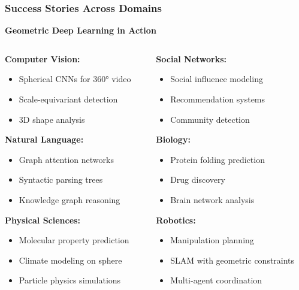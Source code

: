 \begin{frame}[fragile]\frametitle{Success Stories Across Domains}

\begin{center}
\textbf{Geometric Deep Learning in Action}
\end{center}

\begin{columns}
\begin{column}{0.5\textwidth}
\textbf{Computer Vision:}
\begin{itemize}
\item Spherical CNNs for 360° video
\item Scale-equivariant detection
\item 3D shape analysis
\end{itemize}

\textbf{Natural Language:}
\begin{itemize}
\item Graph attention networks
\item Syntactic parsing trees
\item Knowledge graph reasoning
\end{itemize}

\textbf{Physical Sciences:}
\begin{itemize}
\item Molecular property prediction
\item Climate modeling on sphere
\item Particle physics simulations
\end{itemize}
\end{column}
\begin{column}{0.5\textwidth}
\textbf{Social Networks:}
\begin{itemize}
\item Social influence modeling
\item Recommendation systems
\item Community detection
\end{itemize}

\textbf{Biology:}
\begin{itemize}
\item Protein folding prediction
\item Drug discovery
\item Brain network analysis
\end{itemize}

\textbf{Robotics:}
\begin{itemize}
\item Manipulation planning
\item SLAM with geometric constraints
\item Multi-agent coordination
\end{itemize}
\end{column}
\end{columns}


\end{frame}

